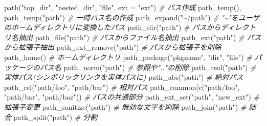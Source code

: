 \documentclass[
]{article}
\newenvironment{Shaded}{\begin{snugshade}}{\end{snugshade}}
\newcommand{\AttributeTok}[1]{\textcolor[rgb]{0.77,0.63,0.00}{#1}}
\newcommand{\CommentTok}[1]{\textcolor[rgb]{0.56,0.35,0.01}{\textit{#1}}}
\newcommand{\FunctionTok}[1]{\textcolor[rgb]{0.00,0.00,0.00}{#1}}
\newcommand{\NormalTok}[1]{#1}
\newcommand{\StringTok}[1]{\textcolor[rgb]{0.31,0.60,0.02}{#1}}
\begin{document}
\begin{Shaded}
\begin{Highlighting}[]
\FunctionTok{path}\NormalTok{(}\StringTok{"top\_dir"}\NormalTok{, }\StringTok{"nested\_dir"}\NormalTok{, }\StringTok{"file"}\NormalTok{, }\AttributeTok{ext =} \StringTok{"ext"}\NormalTok{) }\CommentTok{\# パス作成   }
\FunctionTok{path\_temp}\NormalTok{(), }\FunctionTok{path\_temp}\NormalTok{(}\StringTok{"path"}\NormalTok{) }\CommentTok{\# 一時パス名の作成   }
\FunctionTok{path\_expand}\NormalTok{(}\StringTok{"\textasciitilde{}/path"}\NormalTok{) }\CommentTok{\# "\textasciitilde{}"をユーザのホームディレクトリに変換したパス   }
\FunctionTok{path\_dir}\NormalTok{(}\StringTok{"path"}\NormalTok{) }\CommentTok{\# パスからディレクトリ名抽出   }
\FunctionTok{path\_file}\NormalTok{(}\StringTok{"path"}\NormalTok{) }\CommentTok{\# パスからファイル名抽出   }
\FunctionTok{path\_ext}\NormalTok{(}\StringTok{"path"}\NormalTok{) }\CommentTok{\# パスから拡張子抽出   }
\FunctionTok{path\_ext\_remove}\NormalTok{(}\StringTok{"path"}\NormalTok{) }\CommentTok{\# パスから拡張子を削除   }
\FunctionTok{path\_home}\NormalTok{() }\CommentTok{\# ホームディレクトリ   }
\FunctionTok{path\_package}\NormalTok{(}\StringTok{"pkgname"}\NormalTok{, }\StringTok{"dir"}\NormalTok{, }\StringTok{"file"}\NormalTok{) }\CommentTok{\# パッケージのパス名   }
\FunctionTok{path\_norm}\NormalTok{(}\StringTok{"path"}\NormalTok{) }\CommentTok{\# 参照や".."の削除   }
\FunctionTok{path\_real}\NormalTok{(}\StringTok{"path"}\NormalTok{) }\CommentTok{\# 実体パス(シンボリックリンクを実体パスに)   }
\FunctionTok{path\_abs}\NormalTok{(}\StringTok{"path"}\NormalTok{) }\CommentTok{\# 絶対パス}
\FunctionTok{path\_rel}\NormalTok{(}\StringTok{"path/foo"}\NormalTok{, }\StringTok{"path/bar"}\NormalTok{) }\CommentTok{\#  相対パス  }
\FunctionTok{path\_common}\NormalTok{(}\FunctionTok{c}\NormalTok{(}\StringTok{"path/foo"}\NormalTok{, }\StringTok{"path/bar"}\NormalTok{, }\StringTok{"path/baz"}\NormalTok{)) }\CommentTok{\# パスの共通部分   }
\FunctionTok{path\_ext\_set}\NormalTok{(}\StringTok{"path"}\NormalTok{, }\StringTok{"new\_ext"}\NormalTok{) }\CommentTok{\# 拡張子変更   }
\FunctionTok{path\_sanitize}\NormalTok{(}\StringTok{"path"}\NormalTok{) }\CommentTok{\# 無効な文字を削除   }
\FunctionTok{path\_join}\NormalTok{(}\StringTok{"path"}\NormalTok{) }\CommentTok{\# 結合}
\FunctionTok{path\_split}\NormalTok{(}\StringTok{"path"}\NormalTok{) }\CommentTok{\# 分割}
\end{Highlighting}
\end{Shaded}
\end{document}
